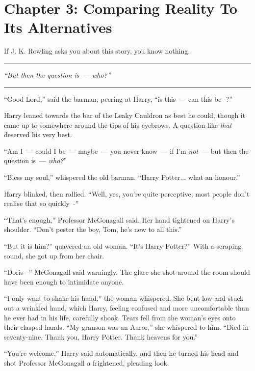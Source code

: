 \chapter{Chapter 3: Comparing Reality To Its Alternatives}
If J. K. Rowling asks you about this story, you know nothing.

\begin{center}\rule{3in}{0.4pt}\end{center}

\emph{``But then the question is~--- who?''}

\begin{center}\rule{3in}{0.4pt}\end{center}

``Good Lord,'' said the barman, peering at Harry, ``is this~--- can this be -?''

Harry leaned towards the bar of the Leaky Cauldron as best he could, though it came up to somewhere around the tips of his eyebrows. A question like \emph{that} deserved his very best.

``Am I~--- could I be~--- maybe~--- you never know~--- if I'm \emph{not}~--- but then the question is~--- \emph{who?}''

``Bless my soul,'' whispered the old barman. ``Harry Potter... what an honour.''

Harry blinked, then rallied. ``Well, yes, you're quite perceptive; most people don't realise that so quickly~-''

``That's enough,'' Professor McGonagall said. Her hand tightened on Harry's shoulder. ``Don't pester the boy, Tom, he's new to all this.''

``But it is him?'' quavered an old woman. ``It's Harry Potter?'' With a scraping sound, she got up from her chair.

``Doris~-'' McGonagall said warningly. The glare she shot around the room should have been enough to intimidate anyone.

``I only want to shake his hand,'' the woman whispered. She bent low and stuck out a wrinkled hand, which Harry, feeling confused and more uncomfortable than he ever had in his life, carefully shook. Tears fell from the woman's eyes onto their clasped hands. ``My granson was an Auror,'' she whispered to him. ``Died in seventy-nine. Thank you, Harry Potter. Thank heavens for you.''

``You're welcome,'' Harry said automatically, and then he turned his head and shot Professor McGonagall a frightened, pleading look.

